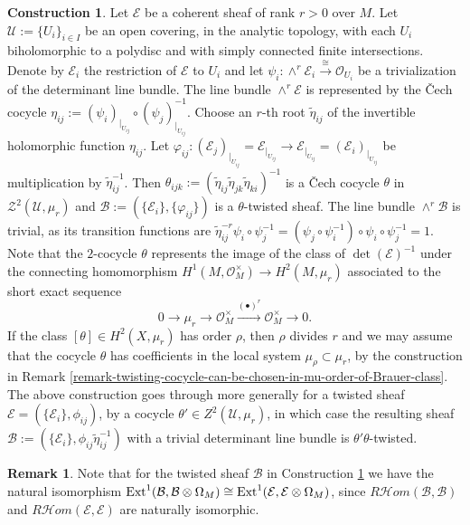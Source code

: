 \documentclass[12pt]{amsart}
\numberwithin{equation}{subsection}
\theoremstyle{plain}
\theoremstyle{definition}
\newtheorem{rem}[thm]{Remark}
\newtheorem{construction}[thm]{Construction}
\newcommand{\B}{{\mathcal B}}
\newcommand{\E}{{\mathcal E}}
\newcommand{\U}{{\mathcal U}}
\newcommand{\Z}{{\mathcal Z}}
\newcommand{\IsomRightArrow}{\stackrel{\cong}{\rightarrow}}
\newcommand{\RightArrowOf}[1]{\stackrel{#1}{\rightarrow}}
\newcommand{\StructureSheaf}[1]{{\mathcal O}_{#1}}
\newcommand{\restricted}[2]{#1_{\mid_{#2}}}
\newcommand{\Ext}{{\rm Ext}}
\newcommand{\SheafHom}{{\mathcal H}om}
\begin{document}
\begin{construction}
\label{construction-twisted-sheaf-with-trivial-determinant-associated-to-a-coherent-sheaf}
Let $\E$ be a  coherent sheaf of rank $r>0$ over $M$. Let $\U:=\{U_i\}_{i\in I}$ be an open covering, in the analytic topology,  with each $U_i$ biholomorphic to a polydisc and with simply connected finite intersections. Denote by $\E_i$ the restriction of $\E$ to $U_i$ and let
$\psi_i:\wedge^r\E_i\IsomRightArrow \StructureSheaf{U_i}$ be a trivialization of the determinant line bundle. 
The line bundle $\wedge^r\E$ is represented by the \v{C}ech cocycle $\eta_{ij}:=(\psi_i\restricted{)}{U_{ij}}\circ(\psi_j\restricted{)}{U_{ij}}^{-1}$.
Choose an $r$-th root $\tilde{\eta}_{ij}$ of the invertible holomorphic function
$\eta_{ij}$. 
Let $\varphi_{ij}:(\E_j\restricted{)}{U_{ij}}=\restricted{\E}{U_{ij}}\rightarrow \restricted{\E}{U_{ij}}=(\E_i\restricted{)}{U_{ij}}$ be multiplication by $\tilde{\eta}_{ij}^{-1}$. 
Then $\theta_{ijk}:=(\tilde{\eta}_{ij}\tilde{\eta}_{jk}\tilde{\eta}_{ki})^{-1}$ is a \v{C}ech cocycle 
$\theta$ in $\Z^2(\U,\mu_r)$ and 
$\B:=(\{\E_i\},\{\varphi_{ij}\})$ is a $\theta$-twisted sheaf. 
The line bundle $\wedge^r\B$ is trivial, as its transition functions
are
$\tilde{\eta}_{ij}^{-r}\psi_i\circ \psi_j^{-1}=(\psi_j\circ\psi_i^{-1})\circ\psi_i\circ\psi_j^{-1}=1.$
Note that the $2$-cocycle $\theta$ represents the image of the class of $\det(\E)^{-1}$ under the connecting homomorphism $H^1(M,\StructureSheaf{M}^\times)\rightarrow H^2(M,\mu_r)$ associated to the short exact sequence
\[
0\rightarrow \mu_r\rightarrow \StructureSheaf{M}^\times\RightArrowOf{(\bullet)^r}\StructureSheaf{M}^\times\rightarrow 0.
\]
If the class $[\theta]\in H^2(X,\mu_r)$ has order $\rho$, then $\rho$ divides $r$ and we may assume that the cocycle $\theta$ has coefficients in the local system
$\mu_\rho\subset \mu_r$, by the construction in Remark \ref{remark-twisting-cocycle-can-be-chosen-in-mu-order-of-Brauer-class}.
The above construction goes through more generally for a twisted sheaf $\E=(\{\E_i\},\phi_{ij})$, by a cocycle $\theta'\in Z^2(\U,\mu_r)$, in which case the resulting sheaf $\B:=(\{\E_i\},\phi_{ij}\tilde{\eta}_{ij}^{-1})$ with a trivial determinant line bundle is $\theta'\theta$-twisted.
\end{construction}


\begin{rem}
Note that for the twisted sheaf $\B$ in Construction \ref{construction-twisted-sheaf-with-trivial-determinant-associated-to-a-coherent-sheaf}
we have the natural isomorphism $\Ext^1(\B,\B\otimes \Omega_M)\cong \Ext^1(\E,\E\otimes \Omega_M)$, 
since $R\SheafHom(\B,\B)$ and $R\SheafHom(\E,\E)$ are naturally isomorphic.
\end{rem}
\end{document}
